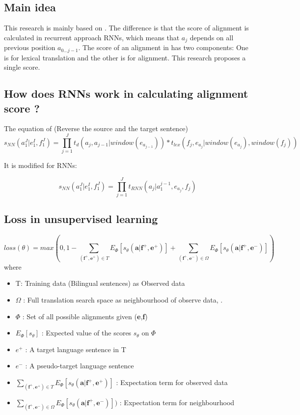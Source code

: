 \documentclass{article}
\begin{document}
\subsection{Main idea}
This research is mainly based on \citep{Yang13word}. The difference is that the score of alignment is calculated in recurrent approach RNNs, which means that $a_j$ depends on all previous position $a_{0...j-1}$.
The score of an alignment in \citep{Yang13word} has two components: One is for lexical translation and the other is for alignment. This research proposes a single score.

\subsection{How does RNNs work in calculating alignment score ?}

The equation of \citep{Yang13word} (Reverse the source and the target sentence)
\begin{equation}
s_{NN}(a_1^ J|e_1^ I, f_1^ J) = \prod_{j = 1}^{J} t_{d}(a_{j},a_{j-1}|window(e_{a_{j-1}})) *t_{lex}(f_{j},e_{a_{j}}|window(e_{a_{j}}), window(f_{j}))
\end{equation}

It is modified for RNNs:

\begin{equation}
s_{NN}(a_1^ J|e_1^ I, f_1^ J) = \prod_{j = 1}^{J} t_{RNN}(a_{j}|a_1^{j-1},e_{a_{j}},f_j  )
\end{equation}

\subsection{Loss in unsupervised learning} 
\begin{equation}
loss(\theta) = max(0 , 1 - \sum_{(\textbf{f}^+,\textbf{e}^+) \in T} E_{\Phi} [s_{\theta} (\textbf{a}|\textbf{f}^+, \textbf{e}^+)]  + \sum_{(\textbf{f}^+,\textbf{e}^-) \in \Omega} E_{\Phi} [s_{\theta} (\textbf{a}|\textbf{f}^+, \textbf{e}^-)] )
\label{Tamura14recurrent Loss Unsupervised Learning}
\end{equation}
where
\begin{itemize}
\item T: Training data (Bilingual sentences) as Observed data
\item $\Omega$ : Full translation search space as neighbourhood of observe data, .
\item $\Phi$ : Set of all possible alignments given (\textbf{e},\textbf{f})
\item $E_{\Phi} [s_{\theta}]$ : Expected value of the scores $s_\theta$ on $\Phi$
\item $e^+$ : A target language sentence in T
\item $e^-$ : A pseudo-target language sentence
\item $\sum_{(\textbf{f}^+,\textbf{e}^+) \in T} E_{\Phi} [s_{\theta} (\textbf{a}|\textbf{f}^+, \textbf{e}^+)]$ : Expectation term for observed data
\item$ \sum_{(\textbf{f}^+,\textbf{e}^-) \in \Omega} E_{\Phi} [s_{\theta} (\textbf{a}|\textbf{f}^+, \textbf{e}^-)] )$ : Expectation term for neighbourhood
\end{itemize}
\end{document}

